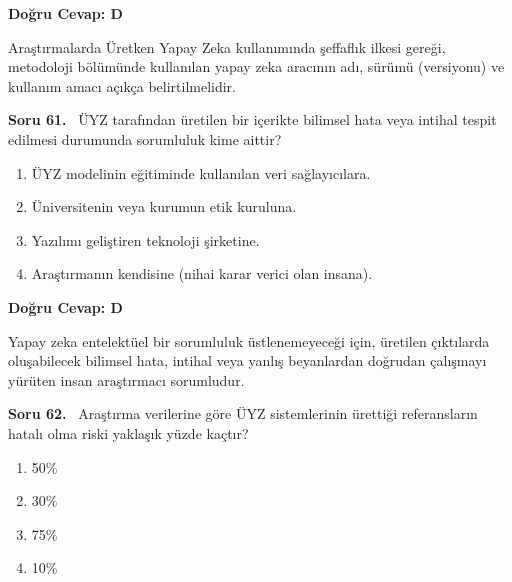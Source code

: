 \documentclass[11pt,a4paper,openany]{book}
\begin{document}
\vspace{4pt}
\begin{tcolorbox}[title=Cevap ve Açıklama, colback=gray!3!white, colframe=primarycolor!90!black, arc=2mm, fonttitle=\bfseries\sffamily, top=6pt, bottom=6pt]
    \textbf{Doğru Cevap: D}

    \vspace{2pt}
    Araştırmalarda Üretken Yapay Zeka kullanımında şeffaflık ilkesi gereği, metodoloji bölümünde kullanılan yapay zeka aracının adı, sürümü (versiyonu) ve kullanım amacı açıkça belirtilmelidir.
\end{tcolorbox}
\vspace{10pt}
\needspace{5cm}
\vspace{8pt}
\noindent\textbf{\large\sffamily Soru 61.} \ ÜYZ tarafından üretilen bir içerikte bilimsel hata veya intihal tespit edilmesi durumunda sorumluluk kime aittir?

\begin{enumerate}[label=\Alph*), leftmargin=25pt, topsep=4pt, itemsep=2pt]
        \item ÜYZ modelinin eğitiminde kullanılan veri sağlayıcılara.
        \item Üniversitenin veya kurumun etik kuruluna.
        \item Yazılımı geliştiren teknoloji şirketine.
        \item Araştırmanın kendisine (nihai karar verici olan insana).
\end{enumerate}

\vspace{4pt}
\begin{tcolorbox}[title=Cevap ve Açıklama, colback=gray!3!white, colframe=primarycolor!90!black, arc=2mm, fonttitle=\bfseries\sffamily, top=6pt, bottom=6pt]
    \textbf{Doğru Cevap: D}

    \vspace{2pt}
    Yapay zeka entelektüel bir sorumluluk üstlenemeyeceği için, üretilen çıktılarda oluşabilecek bilimsel hata, intihal veya yanlış beyanlardan doğrudan çalışmayı yürüten insan araştırmacı sorumludur.
\end{tcolorbox}
\vspace{10pt}
\needspace{5cm}
\vspace{8pt}
\noindent\textbf{\large\sffamily Soru 62.} \ Araştırma verilerine göre ÜYZ sistemlerinin ürettiği referansların hatalı olma riski yaklaşık yüzde kaçtır?

\begin{enumerate}[label=\Alph*), leftmargin=25pt, topsep=4pt, itemsep=2pt]
        \item 50\%
        \item 30\%
        \item 75\%
        \item 10\%
\end{enumerate}
\end{document}
